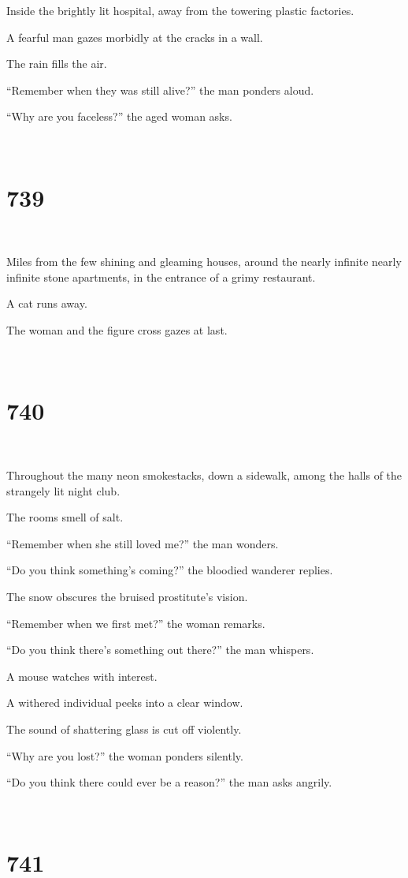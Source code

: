 \documentclass{report}
\begin{document}
Inside the brightly lit hospital, away from the towering plastic factories.

A fearful man gazes morbidly at the cracks in a wall.

The rain fills the air.

``Remember when they was still alive?'' the man ponders aloud.

``Why are you faceless?'' the aged woman asks.

~
\chapter*{739}
~

Miles from the few shining and gleaming houses, around the nearly infinite nearly infinite stone apartments, in the entrance of a grimy restaurant.

A cat runs away.

The woman and the figure cross gazes at last.

~
\chapter*{740}
~

Throughout the many neon smokestacks, down a sidewalk, among the halls of the strangely lit night club.

The rooms smell of salt.

``Remember when she still loved me?'' the man wonders.

``Do you think something's coming?'' the bloodied wanderer replies.

The snow obscures the bruised prostitute's vision.

``Remember when we first met?'' the woman remarks.

``Do you think there's something out there?'' the man whispers.

A mouse watches with interest.

A withered individual peeks into a clear window.

The sound of shattering glass is cut off violently.

``Why are you lost?'' the woman ponders silently.

``Do you think there could ever be a reason?'' the man asks angrily.

~
\chapter*{741}
~
\end{document}
